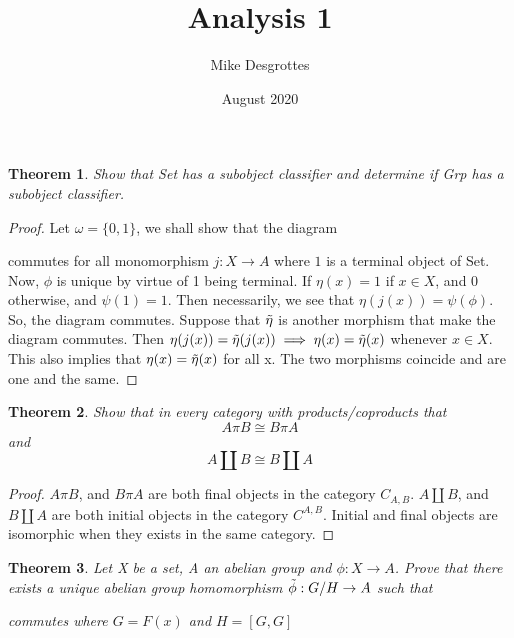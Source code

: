 \documentclass{article}
\title{Analysis 1}
\author{Mike Desgrottes}
\date{August 2020}
\theoremstyle{plain}
\newtheorem{theorem}{Theorem}
\theoremstyle{definition}
\begin{document}
\maketitle
 \section{}
\begin{theorem}
Show that Set has a subobject classifier and determine if Grp has a subobject classifier. 
\end{theorem}

\begin{proof}
Let $ \omega = \{ 0,1\}$, we shall show that the diagram  commutes for all monomorphism $j: X \to A$ where $1$ is a terminal object of Set. Now, $\phi$ is unique by virtue of 1 being terminal. If $\eta(x) = 1$ if $x \in X$, and $0$ otherwise, and $\psi(1) = 1$. Then necessarily, we see that $\eta(j(x)) = \psi(\phi)$. So, the diagram commutes. Suppose that $\Tilde{\eta}$ is another morphism that make the diagram commutes. Then $\eta(j(x)) = \Tilde{\eta}(j(x)) \implies \eta(x) = \Tilde{\eta}(x)$ whenever $x \in X$. This also implies that $\eta(x) = \Tilde{\eta}(x)$ for all x. The two morphisms coincide and are one and the same. 
\end{proof}
\begin{theorem}
Show that in every category with products/coproducts that $$ A \pi B \cong B \pi A$$ and $$ A \amalg B \cong B \amalg A $$
\end{theorem}

\begin{proof}
$A \pi B$, and $B \pi A$ are both final objects in the category $C_{A,B}$. $A \amalg B$, and $B \amalg A$ are both initial objects in the category $C^{A,B}$. Initial and final objects are isomorphic when they exists in the same category.
\end{proof}
\begin{theorem}
Let X be a set, A an abelian group and $\phi: X \to A$. Prove that there exists  a unique abelian group homomorphism $\Tilde{\phi} : G/H \to A$ such that 
 commutes where $G = F(x)$ and $H = [G,G]$

\end{theorem}
\end{document}
